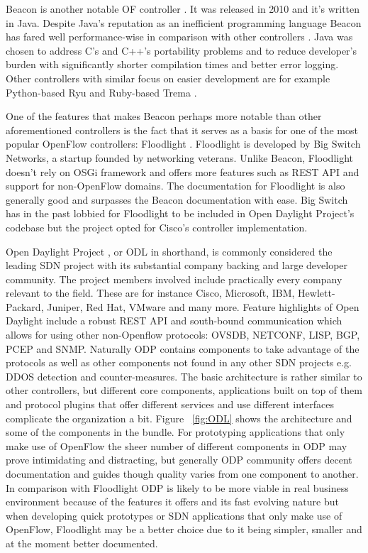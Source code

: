 	Beacon is another notable OF controller \cite{Beacon}. It was released in 2010 and it’s written in Java. Despite Java’s reputation as an inefficient programming language Beacon has fared well performance-wise in comparison with other controllers \cite{Erickson13}. Java was chosen to address C’s and C++’s portability problems and to reduce developer’s burden with significantly shorter compilation times and better error logging. Other controllers with similar focus on easier development are for example Python-based Ryu \cite{Ryu} and Ruby-based Trema \cite{Trema}.

One of the features that makes Beacon perhaps more notable than other aforementioned controllers is the fact that it serves as a basis for one of the most popular OpenFlow controllers: Floodlight \cite{Floodlight}. Floodlight is developed by Big Switch Networks, a startup founded by networking veterans. Unlike Beacon, Floodlight doesn’t rely on OSGi framework and offers more features such as REST API and support for non-OpenFlow domains. The documentation for Floodlight is also generally good and surpasses the Beacon documentation with ease.
 Big Switch has in the past lobbied for Floodlight to be included in Open Daylight Project’s codebase \cite{BAN13} but the project opted for Cisco’s controller implementation. 

Open Daylight Project \cite{ODL}, or ODL in shorthand, is commonly considered the leading SDN project with its substantial company backing and large developer community. The project members involved include practically every company relevant to the field. These are for instance Cisco, Microsoft, IBM, Hewlett-Packard, Juniper, Red Hat, VMware and many more. Feature highlights of Open Daylight include a robust REST API and south-bound communication which allows for using other non-Openflow protocols: OVSDB, NETCONF, LISP, BGP, PCEP and SNMP. Naturally ODP contains components to take advantage of the protocols as well as other components not found in any other SDN projects e.g. DDOS detection and counter-measures. The basic architecture is rather similar to other controllers, but different core components, applications built on top of them and protocol plugins that offer different services and use different interfaces complicate the organization a bit. Figure ~\ref{fig:ODL} shows the architecture and some of the components in the bundle. For prototyping applications that only make use of OpenFlow the sheer number of different components in ODP may prove intimidating and distracting, but generally ODP community offers decent documentation and guides though quality varies from one component to another. In comparison with Floodlight ODP is likely to be more viable in real business environment because of the features it offers and its fast evolving nature but when developing quick prototypes or SDN applications that only make use of OpenFlow, Floodlight may be a better choice due to it being simpler, smaller and at the moment better documented.

